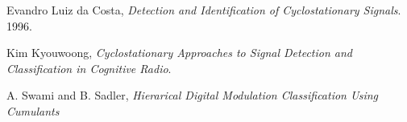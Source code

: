 \begin{thebibliography}{9}

  Evandro Luiz da Costa,
  \emph{Detection and Identification of Cyclostationary Signals}.
  1996.

  Kim Kyouwoong,
  \emph{Cyclostationary Approaches to Signal Detection and Classification in
  Cognitive Radio}.

  A. Swami and B. Sadler,
  \emph{Hierarical Digital Modulation Classification Using Cumulants}
  
\end{thebibliography}